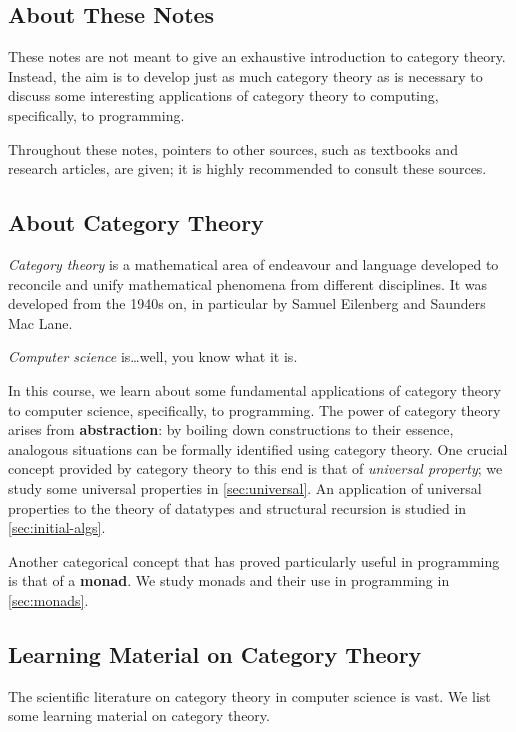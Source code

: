 \documentclass[a4paper,10pt]{scrartcl}
\theoremstyle{plain}
\theoremstyle{definition}
\begin{document}
\subsection{About These Notes}

These notes are not meant to give an exhaustive introduction to category theory.
Instead, the aim is to develop just as much category theory as is necessary to discuss some interesting applications of category theory to computing, specifically, to programming.

Throughout these notes, pointers to other sources, such as textbooks and research articles, are given;
it is highly recommended to consult these sources.

\subsection{About Category Theory}

\emph{Category theory} is a mathematical area of endeavour and language developed to reconcile and unify mathematical phenomena from different disciplines.
It was developed from the 1940s on, in particular by Samuel Eilenberg and Saunders Mac Lane.

\emph{Computer science} is\ldots well, you know what it is.

In this course, we learn about some fundamental applications of category theory to computer science, specifically, to programming.
The power of category theory arises from \textbf{abstraction}:
by boiling down constructions to their essence, analogous situations can be formally identified using category theory.
One crucial concept provided by category theory to this end is that of \emph{universal property};
we study some universal properties in \cref{sec:universal}.
An application of universal properties to the theory of datatypes and structural recursion is studied in \cref{sec:initial-algs}.

Another categorical concept that has proved particularly useful in programming is that of a \textbf{monad}.
We study monads and their use in programming in \cref{sec:monads}.




\subsection{Learning Material on Category Theory}
\label{sec:material}

The scientific literature on category theory in computer science is vast.
We list some learning material on category theory.
\end{document}
